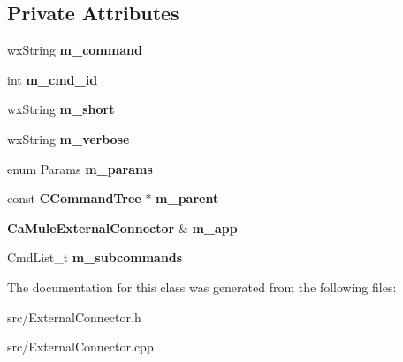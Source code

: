 \subsection*{Private Attributes}
\begin{DoxyCompactItemize}
\item 
wxString {\bfseries m\_\-command}\label{classCCommandTree_abc867d7942cb50d5baf82cafeb37bd57}

\item 
int {\bfseries m\_\-cmd\_\-id}\label{classCCommandTree_ab555f77a31995f3d638ff18a17f6c6ac}

\item 
wxString {\bfseries m\_\-short}\label{classCCommandTree_ac213c2ce3200fcc7abc2199b5b1ddcf8}

\item 
wxString {\bfseries m\_\-verbose}\label{classCCommandTree_ac167a9a75084f7d2e8796ecdd97c31e1}

\item 
enum Params {\bfseries m\_\-params}\label{classCCommandTree_abbd02b539eec7fa112f4042d44a4ec92}

\item 
const {\bf CCommandTree} $\ast$ {\bfseries m\_\-parent}\label{classCCommandTree_acad047112be5d4ac869fd8c188ca20d4}

\item 
{\bf CaMuleExternalConnector} \& {\bfseries m\_\-app}\label{classCCommandTree_aa59cc05c72415e8efdd8c613a7eeec35}

\item 
CmdList\_\-t {\bfseries m\_\-subcommands}\label{classCCommandTree_a5c8a08686dc7c1d6601dd53c6104879b}

\end{DoxyCompactItemize}


The documentation for this class was generated from the following files:\begin{DoxyCompactItemize}
\item 
src/ExternalConnector.h\item 
src/ExternalConnector.cpp\end{DoxyCompactItemize}
